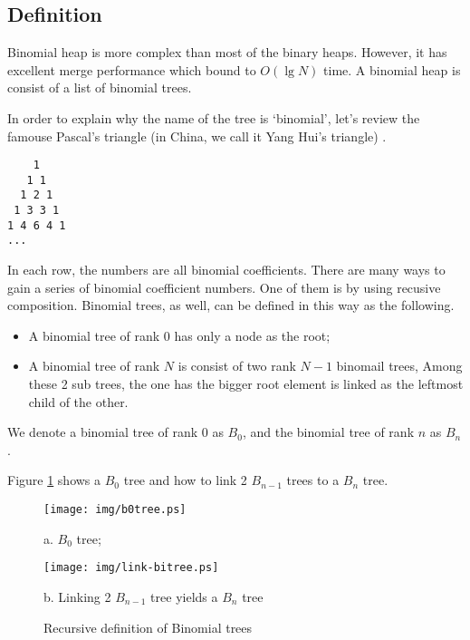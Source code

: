 \documentclass{article}
\begin{document}
\subsection{Definition}

Binomial heap is more complex than most of the binary heaps. However,
it has excellent merge performance which bound to $O(\lg N)$ time. A
binomial heap is consist of a list of binomial trees.

In order to explain why the name of the tree is `binomial', let's review
the famouse Pascal's triangle (in China, we call it Yang Hui's triangle)
\cite{wiki-pascal-triangle}.

\begin{verbatim}
    1
   1 1
  1 2 1
 1 3 3 1
1 4 6 4 1
...
\end{verbatim}

In each row, the numbers are all binomial coefficients. There are many
ways to gain a series of binomial coefficient numbers. One of them is
by using recusive composition. Binomial trees, as well, can be defined
in this way as the following.

\begin{itemize}
\item A binomial tree of rank 0 has only a node as the root;
\item A binomial tree of rank $N$ is consist of two rank $N-1$ binomail trees,
Among these 2 sub trees, the one has the bigger root element is linked as the
leftmost child of the other.
\end{itemize}

We denote a binomial tree of rank 0 as $B_0$, and the binomial tree of rank
$n$ as $B_n$.

Figure \ref{fig:link-bitree} shows a $B_0$ tree and how to link 2 $B_{n-1}$
trees to a $B_n$ tree.

\begin{figure}[htbp]
       \begin{center}
       	  \texttt{[image: img/b0tree.ps]}

          a. $B_0$ tree; 

          \texttt{[image: img/link-bitree.ps]}

          b. Linking 2 $B_{n-1}$ tree yields a $B_n$ tree

        \caption{Recursive definition of Binomial trees} \label{fig:link-bitree}
       \end{center}
\end{figure}
\end{document}
